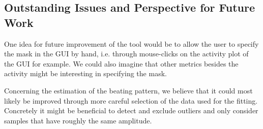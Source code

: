 \documentclass[11pt]{scrartcl}
\begin{document}
\subsection{Outstanding Issues and Perspective for Future Work}
One idea for future improvement of the tool would be to allow the user to specify the mask in the GUI by hand, i.e. through mouse-clicks on the activity plot of the GUI for example. 
We could also imagine that other metrics besides the activity might be interesting in specifying the mask.

Concerning the estimation of the beating pattern, we believe that it could most likely be improved through more careful selection of the data used for the fitting. Concretely it might be beneficial to detect and exclude outliers and only consider samples that have roughly the same amplitude.


\end{document}
